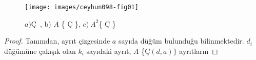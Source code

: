 \documentclass[11pt]{amsbook}
\begin{document}
    \begin{figure}[htb]
	    \centering
	    \texttt{[image: images/ceyhun098-fig01]}
	    \caption{ $a)$Ç\ , b) $A$ \{ Ç \}, $c) \  A^2$\{ Ç \}}
    \end{figure}
    \begin{proof}
        Tanımdan, ayrıt çizgesinde $a$ sayıda düğüm bulunduğu bilinmektedir. $d_i$ düğümüne çakışık olan $k_i$ sayıdaki ayrıt, $A$ \{Ç$(d,a)\}$ ayrıtların
    \end{proof}
\end{document}
